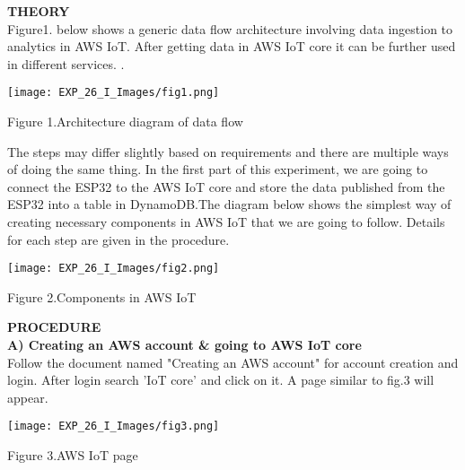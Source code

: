 \documentclass[12pt,a4paper]{article}
\begin{document}
\begin{justify}
\textbf{\large THEORY}\\[3pt]
Figure1. below shows a generic data flow architecture involving data ingestion to analytics in  AWS IoT. After getting data in AWS IoT core it can be further used in different services. .

\begin{center} 
\texttt{[image: EXP\_26\_I\_Images/fig1.png]}
\end{center}
\vspace{-10mm}
\begin{center} {Figure 1.Architecture diagram of data flow}\end{center}

\noindent The steps may differ slightly based on requirements and there are multiple ways of doing the same thing. In the first part of this experiment, we are going to connect the ESP32 to the AWS IoT core and store the data published from the ESP32 into a table in DynamoDB.The diagram below shows the simplest way of creating necessary components in AWS IoT that we are going to follow. Details for each step are given in the procedure.

\begin{center} 
\texttt{[image: EXP\_26\_I\_Images/fig2.png]}
\end{center}
\vspace{-10mm}
\begin{center} {Figure 2.Components in AWS IoT}\end{center}


\noindent \textbf{\large PROCEDURE}\\[6pt]
\textbf{A) Creating an AWS account \& going to AWS IoT core}\\[3pt]
Follow the document named "Creating an AWS account" for account creation and login. After login search  'IoT core' and click on it. A page similar to fig.3 will appear.
\vspace{-5mm}
\begin{center} 
\texttt{[image: EXP\_26\_I\_Images/fig3.png]}
\end{center}
\vspace{-10mm}
\begin{center} {Figure 3.AWS IoT  page}\end{center}
\vspace{3cm}


\end{justify}
\end{document}
